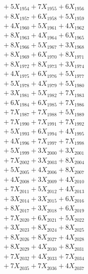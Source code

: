 \documentclass[a4paper,10pt]{article}
\begin{document}
{\begin{align}
&\;  + 5 X_{1954} + 7 X_{1955} + 6 X_{1956} \\[0.3ex]
&\;  + 8 X_{1957} + 6 X_{1958} + 5 X_{1959} \\[0.5ex]\allowbreak
&\;  + 4 X_{1960} + 5 X_{1961} + 4 X_{1962} \\[0.3ex]
&\;  + 8 X_{1963} + 4 X_{1964} + 6 X_{1965} \\[0.3ex]
&\;  + 8 X_{1966} + 5 X_{1967} + 3 X_{1968} \\[0.3ex]
&\;  + 8 X_{1969} + 6 X_{1970} + 8 X_{1971} \\[0.3ex]
&\;  + 8 X_{1972} + 8 X_{1973} + 3 X_{1974} \\[0.3ex]
&\;  + 4 X_{1975} + 6 X_{1976} + 5 X_{1977} \\[0.3ex]
&\;  + 5 X_{1978} + 4 X_{1979} + 5 X_{1980} \\[0.3ex]
&\;  + 3 X_{1981} + 5 X_{1982} + 7 X_{1983} \\[0.3ex]
&\;  + 6 X_{1984} + 6 X_{1985} + 7 X_{1986} \\[0.3ex]
&\;  + 7 X_{1987} + 7 X_{1988} + 5 X_{1989} \\[0.5ex]\allowbreak
&\;  + 7 X_{1990} + 7 X_{1991} + 7 X_{1992} \\[0.3ex]
&\;  + 5 X_{1993} + 6 X_{1994} + 4 X_{1995} \\[0.3ex]
&\;  + 4 X_{1996} + 7 X_{1997} + 7 X_{1998} \\[0.3ex]
&\;  + 5 X_{1999} + 3 X_{2000} + 3 X_{2001} \\[0.3ex]
&\;  + 7 X_{2002} + 3 X_{2003} + 8 X_{2004} \\[0.3ex]
&\;  + 5 X_{2005} + 4 X_{2006} + 8 X_{2007} \\[0.3ex]
&\;  + 4 X_{2008} + 3 X_{2009} + 4 X_{2010} \\[0.3ex]
&\;  + 7 X_{2011} + 5 X_{2012} + 4 X_{2013} \\[0.3ex]
&\;  + 3 X_{2014} + 3 X_{2015} + 6 X_{2016} \\[0.3ex]
&\;  + 8 X_{2017} + 3 X_{2018} + 6 X_{2019} \\[0.5ex]\allowbreak
&\;  + 7 X_{2020} + 6 X_{2021} + 5 X_{2022} \\[0.3ex]
&\;  + 3 X_{2023} + 8 X_{2024} + 8 X_{2025} \\[0.3ex]
&\;  + 8 X_{2026} + 8 X_{2027} + 4 X_{2028} \\[0.3ex]
&\;  + 8 X_{2029} + 4 X_{2030} + 8 X_{2031} \\[0.3ex]
&\;  + 7 X_{2032} + 4 X_{2033} + 7 X_{2034} \\[0.3ex]
&\;  + 7 X_{2035} + 7 X_{2036} + 4 X_{2037} \\[0.3ex]

\end{align}}
\end{document}
